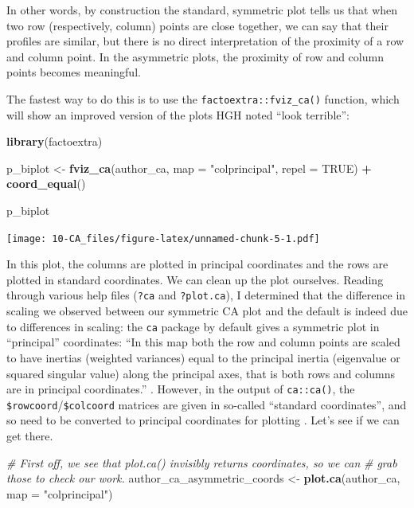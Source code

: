 \documentclass[
]{book}
\newenvironment{Shaded}{\begin{snugshade}}{\end{snugshade}}
\newcommand{\AttributeTok}[1]{\textcolor[rgb]{0.13,0.29,0.53}{#1}}
\newcommand{\CommentTok}[1]{\textcolor[rgb]{0.56,0.35,0.01}{\textit{#1}}}
\newcommand{\ConstantTok}[1]{\textcolor[rgb]{0.56,0.35,0.01}{#1}}
\newcommand{\FunctionTok}[1]{\textcolor[rgb]{0.13,0.29,0.53}{\textbf{#1}}}
\newcommand{\NormalTok}[1]{#1}
\newcommand{\OtherTok}[1]{\textcolor[rgb]{0.56,0.35,0.01}{#1}}
\newcommand{\SpecialCharTok}[1]{\textcolor[rgb]{0.81,0.36,0.00}{\textbf{#1}}}
\newcommand{\StringTok}[1]{\textcolor[rgb]{0.31,0.60,0.02}{#1}}
\begin{document}
In other words, by construction the standard, symmetric plot tells us that when two row (respectively, column) points are close together, we can say that their profiles are similar, but there is no direct interpretation of the proximity of a row and column point. In the asymmetric plots, the proximity of row and column points becomes meaningful.

The fastest way to do this is to use the \texttt{factoextra::fviz\_ca()} function, which will show an improved version of the plots HGH noted ``look terrible'':

\begin{Shaded}
\begin{Highlighting}[]
\FunctionTok{library}\NormalTok{(factoextra)}

\NormalTok{p\_biplot }\OtherTok{\textless{}{-}} 
  \FunctionTok{fviz\_ca}\NormalTok{(author\_ca, }
          \AttributeTok{map =} \StringTok{"colprincipal"}\NormalTok{,}
          \AttributeTok{repel =} \ConstantTok{TRUE}\NormalTok{) }\SpecialCharTok{+}
  \FunctionTok{coord\_equal}\NormalTok{()}

\NormalTok{p\_biplot}
\end{Highlighting}
\end{Shaded}

\texttt{[image: 10-CA\_files/figure-latex/unnamed-chunk-5-1.pdf]}

In this plot, the columns are plotted in principal coordinates and the rows are plotted in standard coordinates. We can clean up the plot ourselves. Reading through various help files (\texttt{?ca} and \texttt{?plot.ca}), I determined that the difference in scaling we observed between our symmetric CA plot and the default is indeed due to differences in scaling: the \texttt{ca} package by default gives a symmetric plot in ``principal'' coordinates: ``In this map both the row and column points are scaled to have inertias (weighted variances) equal to the principal inertia (eigenvalue or squared singular value) along the principal axes, that is both rows and columns are in principal coordinates.'' \citep[\texttt{?plot.ca} vs.][]{abdiCorrespondence}. However, in the output of \texttt{ca::ca()}, the \texttt{\$rowcoord}/\texttt{\$colcoord} matrices are given in so-called ``standard coordinates'', and so need to be converted to principal coordinates for plotting \citep[\texttt{?ca} vs.][]{abdiCorrespondence}. Let's see if we can get there.

\begin{Shaded}
\begin{Highlighting}[]
\CommentTok{\# First off, we see that \textasciigrave{}plot.ca()\textasciigrave{} invisibly returns coordinates, so we can}
\CommentTok{\# grab those to check our work.}
\NormalTok{author\_ca\_asymmetric\_coords }\OtherTok{\textless{}{-}} 
  \FunctionTok{plot.ca}\NormalTok{(author\_ca, }\AttributeTok{map =} \StringTok{"colprincipal"}\NormalTok{)}
\end{Highlighting}
\end{Shaded}
\end{document}
